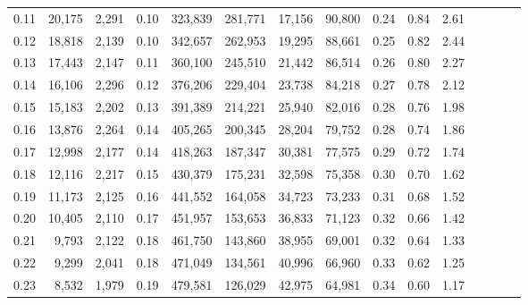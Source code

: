 \begin{tabular}{rrrcrrrrrrrrrrr}
0.11 &  20,175 &  2,291 &                                       0.10 &  323,839 &  281,771 &   17,156 &   90,800 &  0.24 &  0.84 &                         2.61 \\
0.12 &  18,818 &  2,139 &                                       0.10 &  342,657 &  262,953 &   19,295 &   88,661 &  0.25 &  0.82 &                         2.44 \\
0.13 &  17,443 &  2,147 &                                       0.11 &  360,100 &  245,510 &   21,442 &   86,514 &  0.26 &  0.80 &                         2.27 \\
0.14 &  16,106 &  2,296 &                                       0.12 &  376,206 &  229,404 &   23,738 &   84,218 &  0.27 &  0.78 &                         2.12 \\
0.15 &  15,183 &  2,202 &                                       0.13 &  391,389 &  214,221 &   25,940 &   82,016 &  0.28 &  0.76 &                         1.98 \\
0.16 &  13,876 &  2,264 &                                       0.14 &  405,265 &  200,345 &   28,204 &   79,752 &  0.28 &  0.74 &                         1.86 \\
0.17 &  12,998 &  2,177 &                                       0.14 &  418,263 &  187,347 &   30,381 &   77,575 &  0.29 &  0.72 &                         1.74 \\
0.18 &  12,116 &  2,217 &                                       0.15 &  430,379 &  175,231 &   32,598 &   75,358 &  0.30 &  0.70 &                         1.62 \\
0.19 &  11,173 &  2,125 &                                       0.16 &  441,552 &  164,058 &   34,723 &   73,233 &  0.31 &  0.68 &                         1.52 \\
0.20 &  10,405 &  2,110 &                                       0.17 &  451,957 &  153,653 &   36,833 &   71,123 &  0.32 &  0.66 &                         1.42 \\
0.21 &   9,793 &  2,122 &                                       0.18 &  461,750 &  143,860 &   38,955 &   69,001 &  0.32 &  0.64 &                         1.33 \\
0.22 &   9,299 &  2,041 &                                       0.18 &  471,049 &  134,561 &   40,996 &   66,960 &  0.33 &  0.62 &                         1.25 \\
0.23 &   8,532 &  1,979 &                                       0.19 &  479,581 &  126,029 &   42,975 &   64,981 &  0.34 &  0.60 &                         1.17 \\

\end{tabular}
